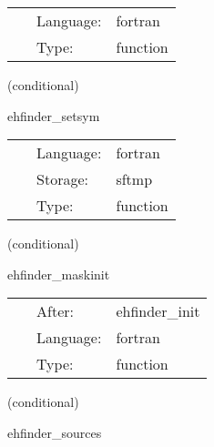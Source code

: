 \hspace{5mm}{\it read in conformal factor from file } 


\hspace{5mm}

 \begin{tabular*}{160mm}{cll} 
~ & Language:  & fortran \\ 
~ & Type:  & function \\ 
\end{tabular*} 


\vspace{5mm}

   (conditional) 

\hspace{5mm} ehfinder\_setsym 

\hspace{5mm}{\it register the symmetries for the level set function } 


\hspace{5mm}

 \begin{tabular*}{160mm}{cll} 
~ & Language:  & fortran \\ 
~ & Storage:  & sftmp \\ 
~ & Type:  & function \\ 
\end{tabular*} 


\vspace{5mm}

   (conditional) 

\hspace{5mm} ehfinder\_maskinit 

\hspace{5mm}{\it setup the initial mask } 


\hspace{5mm}

 \begin{tabular*}{160mm}{cll} 
~ & After:  & ehfinder\_init \\ 
~ & Language:  & fortran \\ 
~ & Type:  & function \\ 
\end{tabular*} 


\vspace{5mm}

   (conditional) 

\hspace{5mm} ehfinder\_sources 

